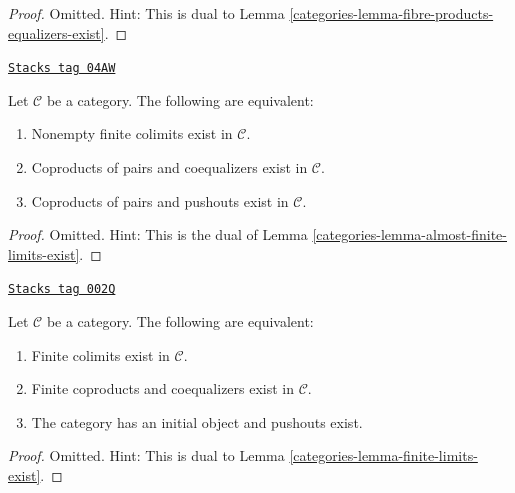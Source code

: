 \begin{proof}

Omitted. Hint: This is dual to
Lemma \ref{categories-lemma-fibre-products-equalizers-exist}.
\end{proof}

\begin{lemma}
\label{categories-lemma-almost-finite-colimits-exist}
\href{https://stacks.math.columbia.edu/tag/04AW}{\texttt{Stacks tag 04AW}}

Let $\mathcal{C}$ be a category.
The following are equivalent:
\begin{enumerate}
\item Nonempty finite colimits exist in $\mathcal{C}$.
\item Coproducts of pairs and coequalizers exist in $\mathcal{C}$.
\item Coproducts of pairs and pushouts exist in $\mathcal{C}$.
\end{enumerate}
\end{lemma}

\begin{proof}

Omitted. Hint: This is the dual of
Lemma \ref{categories-lemma-almost-finite-limits-exist}.
\end{proof}

\begin{lemma}
\label{categories-lemma-colimits-exist}
\href{https://stacks.math.columbia.edu/tag/002Q}{\texttt{Stacks tag 002Q}}

Let $\mathcal{C}$ be a category.
The following are equivalent:
\begin{enumerate}
\item Finite colimits exist in $\mathcal{C}$.
\item Finite coproducts and coequalizers exist in $\mathcal{C}$.
\item The category has an initial object and pushouts exist.
\end{enumerate}
\end{lemma}

\begin{proof}

Omitted. Hint: This is dual to Lemma \ref{categories-lemma-finite-limits-exist}.
\end{proof}


